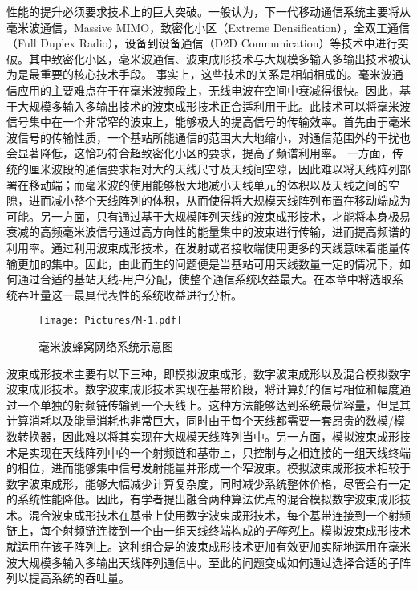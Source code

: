 性能的提升必须要求技术上的巨大突破。一般认为，下一代移动通信系统主要将从毫米波通信\cite{noh2016zero,li2016optimizing}，Massive MIMO\cite{araujo2016massive}，致密化小区\cite{qian2017joint}（Extreme Densification），全双工通信（Full Duplex Radio），设备到设备通信（D2D Communication）等技术中进行突破。其中致密化小区，毫米波通信、波束成形技术与大规模多输入多输出技术被认为是最重要的核心技术手段。
事实上，这些技术的关系是相辅相成的。毫米波通信应用的主要难点在于在毫米波频段上，无线电波在空间中衰减得很快\cite{sulyman2014radio}。因此，基于大规模多输入多输出技术的波束成形技术正合适利用于此。此技术可以将毫米波信号集中在一个非常窄的波束上，能够极大的提高信号的传输效率\cite{li2009robust,roh2014millimeter}。首先由于毫米波信号的传输性质，一个基站所能通信的范围大大地缩小，对通信范围外的干扰也会显著降低，这恰巧符合超致密化小区的要求，提高了频谱利用率。 一方面，传统的厘米波段的通信要求相对大的天线尺寸及天线间空隙，因此难以将天线阵列部署在移动端；而毫米波的使用能够极大地减小天线单元的体积以及天线之间的空隙，进而减小整个天线阵列的体积，从而使得将大规模天线阵列布置在移动端成为可能。另一方面，只有通过基于大规模阵列天线的波束成形技术，才能将本身极易衰减的高频毫米波信号通过高方向性的能量集中的波束进行传输，进而提高频谱的利用率。通过利用波束成形技术，在发射或者接收端使用更多的天线意味着能量传输更加的集中。因此，由此而生的问题便是当基站可用天线数量一定的情况下，如何通过合适的基站天线-用户分配，使整个通信系统收益最大。在本章中将选取系统吞吐量这一最具代表性的系统收益进行分析。

\begin{figure}[t]
\centering
\texttt{[image: Pictures/M-1.pdf]}
\caption{毫米波蜂窝网络系统示意图}
\label{fig:0}
\end{figure}

波束成形技术主要有以下三种，即模拟波束成形，数字波束成形以及混合模拟数字波束成形技术。数字波束成形技术实现在基带阶段，将计算好的信号相位和幅度通过一个单独的射频链传输到一个天线上。这种方法能够达到系统最优容量，但是其计算消耗以及能量消耗也非常巨大，同时由于每个天线都需要一套昂贵的数模/模数转换器，因此难以将其实现在大规模天线阵列当中\cite{doan2004design}。另一方面，模拟波束成形技术\cite{wang2009beam}是实现在天线阵列中的一个射频链和基带上，只控制与之相连接的一组天线终端的相位，进而能够集中信号发射能量并形成一个窄波束。模拟波束成形技术相较于数字波束成形，能够大幅减少计算复杂度，同时减少系统整体价格，尽管会有一定的系统性能降低。因此，有学者提出融合两种算法优点的混合模拟数字波束成形技术。混合波束成形技术在基带上使用数字波束成形技术，每个基带连接到一个射频链上，每个射频链连接到一个由一组天线终端构成的\emph{子阵列}上。模拟波束成形技术就运用在该子阵列上。这种组合是的波束成形技术更加有效更加实际地运用在毫米波大规模多输入多输出天线阵列通信中。至此的问题变成如何通过选择合适的子阵列以提高系统的吞吐量。

